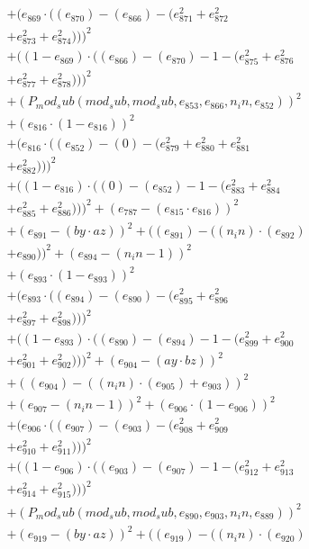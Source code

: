 \documentclass[10pt, a4paper]{article}
\begin{document}
\begin{small}
\begin{align*}
& + (e_{869}  \cdot  ((e_{870}) - (e_{866}) - (e_{871}^{2} + e_{872}^{2} \\
& + e_{873}^{2} + e_{874}^{2})))^{2} \\
& + ((1 - e_{869})  \cdot  ((e_{866}) - (e_{870}) - 1 - (e_{875}^{2} + e_{876}^{2} \\
& + e_{877}^{2} + e_{878}^{2})))^{2} \\
& + (P_mod_sub(mod_sub, mod_sub, e_{853}, e_{866}, n_in, e_{852}))^{2} \\
& + (e_{816}  \cdot  (1 - e_{816}))^{2} \\
& + (e_{816}  \cdot  ((e_{852}) - (0) - (e_{879}^{2} + e_{880}^{2} + e_{881}^{2} \\
& + e_{882}^{2})))^{2} \\
& + ((1 - e_{816})  \cdot  ((0) - (e_{852}) - 1 - (e_{883}^{2} + e_{884}^{2} \\
& + e_{885}^{2} + e_{886}^{2})))^{2} + (e_{787} - (e_{815}  \cdot  e_{816}))^{2} \\
& + (e_{891} - (by  \cdot  az))^{2} + ((e_{891}) - ((n_in)  \cdot  (e_{892}) \\
& + e_{890}))^{2} + (e_{894} - (n_in - 1))^{2} \\
& + (e_{893}  \cdot  (1 - e_{893}))^{2} \\
& + (e_{893}  \cdot  ((e_{894}) - (e_{890}) - (e_{895}^{2} + e_{896}^{2} \\
& + e_{897}^{2} + e_{898}^{2})))^{2} \\
& + ((1 - e_{893})  \cdot  ((e_{890}) - (e_{894}) - 1 - (e_{899}^{2} + e_{900}^{2} \\
& + e_{901}^{2} + e_{902}^{2})))^{2} + (e_{904} - (ay  \cdot  bz))^{2} \\
& + ((e_{904}) - ((n_in)  \cdot  (e_{905}) + e_{903}))^{2} \\
& + (e_{907} - (n_in - 1))^{2} + (e_{906}  \cdot  (1 - e_{906}))^{2} \\
& + (e_{906}  \cdot  ((e_{907}) - (e_{903}) - (e_{908}^{2} + e_{909}^{2} \\
& + e_{910}^{2} + e_{911}^{2})))^{2} \\
& + ((1 - e_{906})  \cdot  ((e_{903}) - (e_{907}) - 1 - (e_{912}^{2} + e_{913}^{2} \\
& + e_{914}^{2} + e_{915}^{2})))^{2} \\
& + (P_mod_sub(mod_sub, mod_sub, e_{890}, e_{903}, n_in, e_{889}))^{2} \\
& + (e_{919} - (by  \cdot  az))^{2} + ((e_{919}) - ((n_in)  \cdot  (e_{920}) \\

\end{align*}
\end{small}
\end{document}

